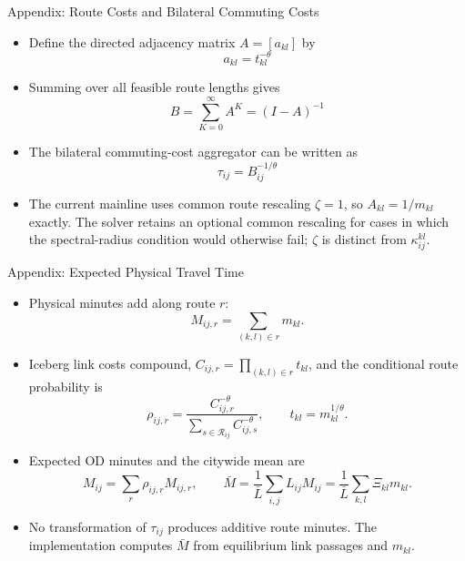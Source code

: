 \documentclass[11pt,aspectratio=169]{beamer}
\newcommand{\navback}[1]{\par\vspace{0.35em}\noindent\hfill\hyperlink{#1}{\beamerreturnbutton{back}}}
\begin{document}
\begin{frame}[label=approute]{Appendix: Route Costs and Bilateral Commuting Costs}
\begin{itemize}\small
  \item Define the directed adjacency matrix $A=[a_{kl}]$ by
  \vspace{-0.5em}\begin{equation}
    a_{kl} = t_{kl}^{-\theta}
  \end{equation}
  \item Summing over all feasible route lengths gives
  \vspace{-0.5em}\begin{equation}
    B = \sum_{K=0}^{\infty}A^K = (I-A)^{-1}
  \end{equation}
  \item The bilateral commuting-cost aggregator can be written as
  \vspace{-0.5em}\begin{equation}\label{eq:inverse}
    \tau_{ij} = B_{ij}^{-1/\theta}
  \end{equation}
  \vspace{-0.5em}
  \item The current mainline uses common route rescaling $\zeta=1$, so $A_{kl}=1/m_{kl}$ exactly. The solver retains an optional common rescaling for cases in which the spectral-radius condition would otherwise fail; $\zeta$ is distinct from $\kappa_{ij}^{kl}$.
\end{itemize}
\navback{bilateral}
\end{frame}

\begin{frame}[label=appphysicaltime]{Appendix: Expected Physical Travel Time}
\scriptsize
\begin{itemize}\setlength\itemsep{0.45em}
  \item Physical minutes add along route $r$:
  \vspace{-0.35em}
  \[
    M_{ij,r}=\sum_{(k,l)\in r}m_{kl}.
  \]
  \vspace{-0.75em}
  \item Iceberg link costs compound, $C_{ij,r}=\prod_{(k,l)\in r}t_{kl}$, and the conditional route probability is
  \vspace{-0.35em}
  \[
    \rho_{ij,r}=\frac{C_{ij,r}^{-\theta}}{\sum_{s\in\mathcal R_{ij}}C_{ij,s}^{-\theta}},
    \qquad t_{kl}=m_{kl}^{1/\theta}.
  \]
  \vspace{-0.75em}
  \item Expected OD minutes and the citywide mean are
  \vspace{-0.35em}
  \[
    M_{ij}=\sum_r\rho_{ij,r}M_{ij,r},
    \qquad
    \bar M=\frac{1}{\bar L}\sum_{i,j}L_{ij}M_{ij}
    =\frac{1}{\bar L}\sum_{k,l}\Xi_{kl}m_{kl}.
  \]
  \vspace{-0.75em}
  \item No transformation of $\tau_{ij}$ produces additive route minutes. The implementation computes $\bar M$ from equilibrium link passages and $m_{kl}$.
\end{itemize}
\navback{result2}
\end{frame}
\end{document}

